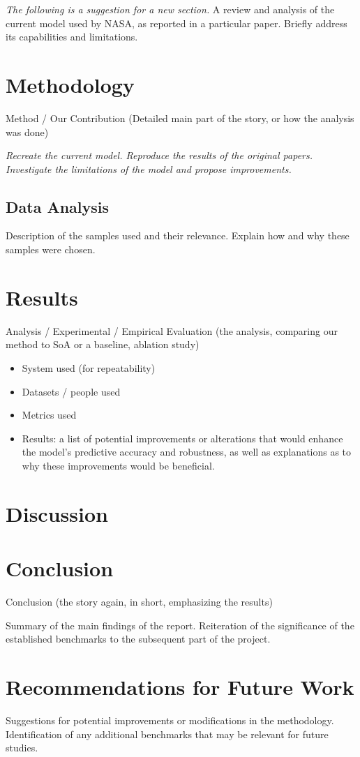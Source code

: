 \textit{The following is a suggestion for a new section.}
A review and analysis of the current model used by NASA, as reported in a particular paper.
Briefly address its capabilities and limitations.

\section{Methodology}
Method / Our Contribution (Detailed main part of the story, or how the analysis was done)

\textit{Recreate the current model. Reproduce the results of the original papers. Investigate the limitations of the model and propose improvements.}

\subsection{Data Analysis}
Description of the samples used and their relevance.
Explain how and why these samples were chosen.

\section{Results}
Analysis / Experimental / Empirical Evaluation (the analysis, comparing our method to SoA or a baseline, ablation study)
\begin{itemize}
    \item System used (for repeatability)
    \item Datasets / people used
    \item Metrics used
    \item Results: a list of potential improvements or alterations that would enhance the model's predictive accuracy and robustness, as well as explanations as to why these improvements would be beneficial.
\end{itemize}

\section{Discussion}

\section{Conclusion}
Conclusion (the story again, in short, emphasizing the results)

Summary of the main findings of the report.
Reiteration of the significance of the established benchmarks to the subsequent part of the project.

\section{Recommendations for Future Work}
Suggestions for potential improvements or modifications in the methodology.
Identification of any additional benchmarks that may be relevant for future studies.
